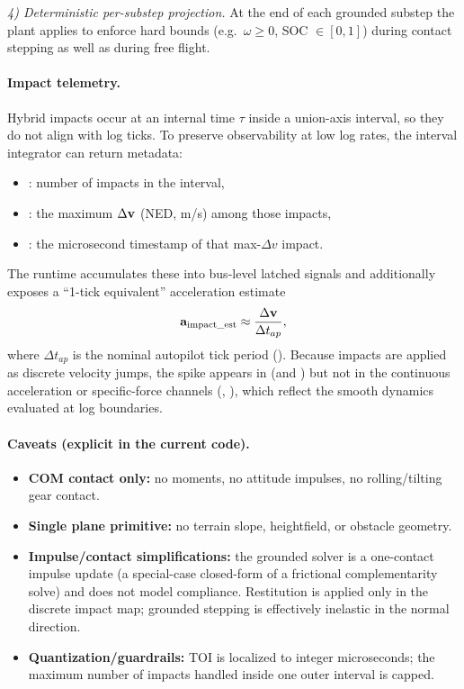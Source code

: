 \emph{4) Deterministic per-substep projection.}
At the end of each grounded substep the plant applies  to enforce hard bounds (e.g.\ \(\omega\ge 0\), SOC \(\in[0,1]\)) during contact stepping as well as during free flight.

\paragraph{Impact telemetry.}
Hybrid impacts occur at an internal time \(\tau\) inside a union-axis interval, so they do not align with log ticks. To preserve observability at low log rates, the interval integrator can return metadata:
\begin{itemize}[leftmargin=*,itemsep=2pt]
  \item {}: number of impacts in the interval,
  \item {}: the maximum \(\Delta\mathbf{v}\) (NED, m/s) among those impacts,
  \item {}: the microsecond timestamp of that max-\(\Delta v\) impact.
\end{itemize}
The runtime accumulates these into bus-level latched signals and additionally exposes a ``1-tick equivalent'' acceleration estimate
\begin{equation}
  \mathbf{a}_{\mathrm{impact\_est}} \approx \frac{\Delta\mathbf{v}}{\Delta t_{ap}},
\end{equation}
where \(\Delta t_{ap}\) is the nominal autopilot tick period ().
Because impacts are applied as discrete velocity jumps, the spike appears in
 (and ) but not in the continuous acceleration or
specific-force channels (, ), which reflect the smooth
dynamics evaluated at log boundaries.

\paragraph{Caveats (explicit in the current code).}
\begin{itemize}[leftmargin=*,itemsep=2pt]
  \item \textbf{COM contact only:} no moments, no attitude impulses, no rolling/tilting gear contact.
  \item \textbf{Single plane primitive:} no terrain slope, heightfield, or obstacle geometry.
  \item \textbf{Impulse/contact simplifications:} the grounded solver is a one-contact impulse update (a special-case closed-form of a frictional complementarity solve) and does not model compliance. Restitution is applied only in the discrete impact map; grounded stepping is effectively inelastic in the normal direction.
  \item \textbf{Quantization/guardrails:} TOI is localized to integer microseconds; the maximum number of impacts handled inside one outer interval is capped.
\end{itemize}

